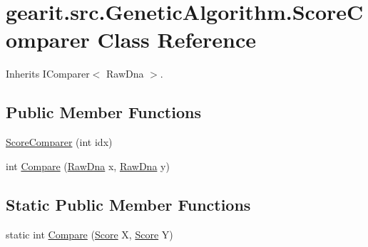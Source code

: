 \hypertarget{classgearit_1_1src_1_1_genetic_algorithm_1_1_score_comparer}{\section{gearit.\+src.\+Genetic\+Algorithm.\+Score\+Comparer Class Reference}
\label{classgearit_1_1src_1_1_genetic_algorithm_1_1_score_comparer}
}


Inherits I\+Comparer$<$ Raw\+Dna $>$.

\subsection*{Public Member Functions}
\begin{DoxyCompactItemize}
\item 
\hyperlink{classgearit_1_1src_1_1_genetic_algorithm_1_1_score_comparer_a707deb73e203aab2f0a22ab149b06720}{Score\+Comparer} (int idx)
\item 
int \hyperlink{classgearit_1_1src_1_1_genetic_algorithm_1_1_score_comparer_aa5f0949f3fcba4636de3de5a5513bc0a}{Compare} (\hyperlink{classgearit_1_1src_1_1_genetic_algorithm_1_1_genome_1_1_raw_dna}{Raw\+Dna} x, \hyperlink{classgearit_1_1src_1_1_genetic_algorithm_1_1_genome_1_1_raw_dna}{Raw\+Dna} y)
\end{DoxyCompactItemize}
\subsection*{Static Public Member Functions}
\begin{DoxyCompactItemize}
\item 
static int \hyperlink{classgearit_1_1src_1_1_genetic_algorithm_1_1_score_comparer_aa53f05cbb8e8a67f96c961cdb106f404}{Compare} (\hyperlink{classgearit_1_1src_1_1game_1_1_score}{Score} X, \hyperlink{classgearit_1_1src_1_1game_1_1_score}{Score} Y)
\end{DoxyCompactItemize}


